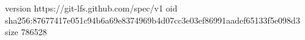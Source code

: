 version https://git-lfs.github.com/spec/v1
oid sha256:87677417e051c94b6a69e8374969b4d07cc3e03ef86991aadef65133f5e098d3
size 786528
